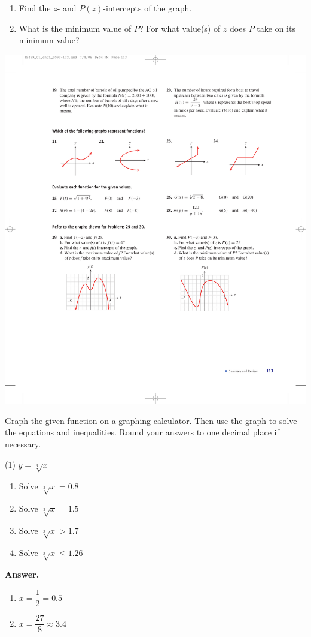\documentclass[10pt,]{book}
\theoremstyle{plain}
\theoremstyle{definition}
\theoremstyle{definition}
\theoremstyle{definition}
\theoremstyle{definition}
\numberwithin{equation}{part}
\newcommand{\gt}{>}
\begin{document}
\begin{exerciselist}
\begin{exercisegroup}
\begin{enumerate}[label=*\alph**]
\item\hypertarget{li-1575}{}Find the \(z\)- and \(P(z)\)-intercepts of the graph.%
\item\hypertarget{li-1576}{}What is the minimum value of \(P\)? For what value(s) of \(z\) does \(P\) take on its minimum value?%
\end{enumerate}
 \includegraphics[width=0.45\linewidth]{images/fig-chap1-rev-30}
%
\end{exercisegroup}
\par\smallskip\noindent
\hypertarget{exercisegroup-57}{}\par\noindent Graph the given function on a graphing calculator. Then use the graph to solve the equations and inequalities. Round your answers to one decimal place if necessary.%
\begin{exercisegroup}(1)
\exercise[31.]\hypertarget{exercise-427}{}\(y=\sqrt[3]{x} \) \leavevmode%
\begin{multicols}{2}
\begin{enumerate}[label=*\alph**]
\item\hypertarget{li-1577}{}Solve \(\sqrt[3]{x} = 0.8\)%
\item\hypertarget{li-1578}{}Solve \(\sqrt[3]{x} = 1.5\)%
\item\hypertarget{li-1579}{}Solve \(\sqrt[3]{x}\gt 1.7 \)%
\item\hypertarget{li-1580}{}Solve \(\sqrt[3]{x}\le 1.26 \)%
\end{enumerate}
\end{multicols}
%
\par\smallskip
\noindent\textbf{Answer.}\hypertarget{answer-237}{}\quad
\leavevmode%
\begin{multicols}{2}
\begin{enumerate}[label=*\alph**]
\item\hypertarget{li-1581}{}\(x = \dfrac{1}{2}= 0.5\)%
\item\hypertarget{li-1582}{}\(x = \dfrac{27}{8}\approx 3.4\)%

\end{enumerate}
\end{multicols}
\end{exercisegroup}
\end{exerciselist}
\end{document}
